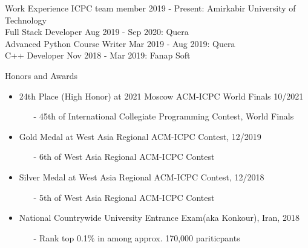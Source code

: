\documentclass{resume} %
\begin{document}
\begin{rSection}{Work Experience}
    {ICPC team member} \hfill {2019 - Present: Amirkabir University of Technology}\\
    {Full Stack Developer} \hfill {Aug 2019 - Sep 2020: Quera}\\
    {Advanced Python Course Writer} \hfill {Mar 2019 - Aug 2019: Quera}\\
    {C++ Developer} \hfill {Nov 2018 - Mar 2019: Fanap Soft}\\
\end{rSection}


\begin{rSection}{Honors and Awards} \itemsep -2pt
        \begin{itemize}[leftmargin=*]
            \item
                24th Place (High Honor) at 2021 Moscow ACM-ICPC World Finals 10/2021
                \begin{itemize}
                    \item[-] 45th of International Collegiate Programming Contest, World Finals
                \end{itemize}

            \item
                Gold Medal at West Asia Regional ACM-ICPC Contest, 12/2019
                \begin{itemize}
                    \item[-] 6th of West Asia Regional ACM-ICPC Contest
                \end{itemize}
            \item
                Silver Medal at West Asia Regional ACM-ICPC Contest, 12/2018
                \begin{itemize}
                    \item[-] 5th of West Asia Regional ACM-ICPC Contest
                \end{itemize}

            \item National Countrywide University Entrance Exam(aka Konkour), Iran, 2018
                \begin{itemize}
                    \item[-] Rank top 0.1\% in among approx. 170,000 pariticpants
                \end{itemize}
        \end{itemize}
\end{rSection}
\end{document}
